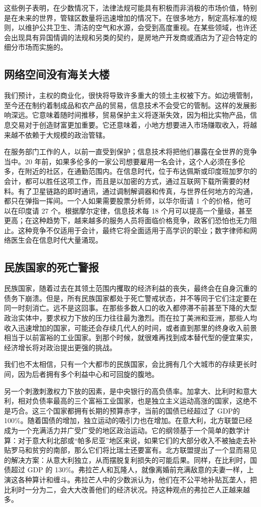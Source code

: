 这些例子表明，在少数情况下，法律法规可能具有积极而非消极的市场价值，特别是在未来的世界，管辖区数量将迅速增加的情况下。在很多地方，制定高标准的规则，以维护公共卫生、清洁的空气和水源，会受到高度重视。在某些领域，也许还会出现具有异国情调的法规和另类的契约，是房地产开发商或酒店为了迎合特定的细分市场而实施的。

\subsection{网络空间没有海关大楼}
我们预计，主权的商业化，很快将导致许多重大的领土主权被下方。如边境管制，至今还在制约着制成品和农产品的贸易，信息技术不会受它的管制。这样的发展影响深远。它意味着随时间推移，贸易保护主义将逐渐失效，因为相比实物产品，信息交易对于创造财富更加重要。它还意味着，小地方想要进入市场赚取收入，将越来越不依赖于大规模的政治管辖。

在服务部门工作的人，以前一直受到保护；信息技术将把他们暴露在全世界的竞争当中。20 年前，如果多伦多的一家公司想要雇用一名会计，这个人必须在多伦多，在附近的社区，在通勤范围内。在信息时代，位于布达佩斯或印度班加罗尔的会计，都可以胜任这项工作，而且是以加密的方式，通过互联网下载所需要的材料。有了卫星链路的即时通讯，通过调制解调器和传真，与世界任何地方的沟通，都只在弹指一挥间。一个人如果需要股票分析师，以华尔街请 1 个的价格，他可以在印度请 27 个。根据摩尔定律，信息技术每 18 个月可以提高一个量级，甚至更高；在这种趋势下，越来越多的服务人员将面临价格竞争，政客们恐怕也无力阻止。这种竞争不仅适用于会计，最终它将全面适用于高学识的职业；数字律师和网络医生会在信息时代大量涌现。

\subsection{民族国家的死亡警报}
民族国家，随着过去在其领土范围内攫取的经济利益的丧失，最终会在自身沉重的债务下崩溃。但是，所有民族国家都处于死亡警戒状态，并不等同于它们注定要在同一时刻消亡。远不是这回事。在那些多数人口的收入都停滞不前甚至下降的大型政治实体中，要求权力下放的压力往往最为激烈。而在拉丁美洲和亚洲，那些人均收入迅速增加的国家，可能还会存续几代人的时间，或者直到那里的终身收入前景相当于以前富裕的工业国家。到那个时候，就很难再找到成本替代型的便宜果实，经济增长将对政治提出更强的挑战。

我们也不太相信，只有一个大都市的民族国家，会比拥有几个大城市的存续更长时间，因为后者拥有多个利益中心和可回旋的腹地。

另一个刺激刺激权力下放的因素，是中央银行的高负债率。加拿大、比利时和意大利，相对负债率最高的三个富裕工业国家，也是独立主义运动高涨的国家，这绝不是巧合。这三个国家都拥有长期的预算赤字，当前的国债已经超过了 GDP的 100\%。随着国债的增加，独立运动的吸引力也在增加。在意大利，北方联盟已经成为一个充满活力并广受广受的地区政治运动。它的纲领基于一个简单的数学计算：对于意大利北部或“帕多尼亚”地区来说，如果它们的大部分收入不被抽走去补贴罗马和贫穷的南部，那么它们将比瑞士还要富有。北方联盟提出了一个显而易见的解决方案：从意大利独立，从而摆脱复利损失的可能后果。同样，在比利时，国债超过 GDP 的 130\%。弗拉芒人和瓦隆人，就像离婚前充满敌意的夫妻一样，上演这各种算计和缠斗。弗拉芒人中的少数派认为，他们在不公平地补贴瓦垄人，把比利时一分为二，会大大改善他们的经济状况。持这种观点的弗拉芒人正越来越多。

